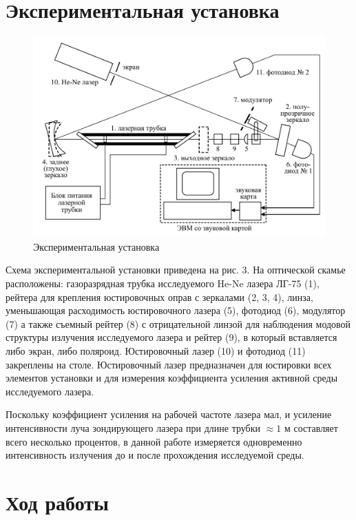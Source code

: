 \documentclass[a4paper,12pt]{article} %
\begin{document}
	\newpage
	\section*{Экспериментальная установка}
	
	\begin{figure}[h!]
		\centering
		\includegraphics[scale=0.7]{Pictures/Установка}
		\caption{Экспериментальная установка}
	\end{figure}

	Схема экспериментальной установки приведена на рис. 3. На оптической скамье расположены: газоразрядная трубка исследуемого He-Ne лазера ЛГ-75 (1), рейтера для крепления юстировочных оправ с зеркалами (2, 3, 4), линза, уменьшающая расходимость юстировочного лазера (5), фотодиод (6), модулятор (7) а также съемный рейтер (8) с отрицательной линзой для наблюдения модовой структуры излучения исследуемого лазера и рейтер (9), в который вставляется либо экран, либо поляроид. Юстировочный лазер (10) и фотодиод (11) закреплены на столе. Юстировочный лазер предназначен для юстировки всех элементов установки и для измерения коэффициента усиления активной среды исследуемого лазера.
	
	Поскольку коэффициент усиления на рабочей частоте лазера мал, и усиление интенсивности луча зондирующего лазера при длине трубки $\approx 1$ м составляет всего несколько процентов, в данной работе измеряется одновременно интенсивность излучения до и после прохождения исследуемой среды.
	
	\newpage
	\section*{Ход работы}
	
\end{document}
